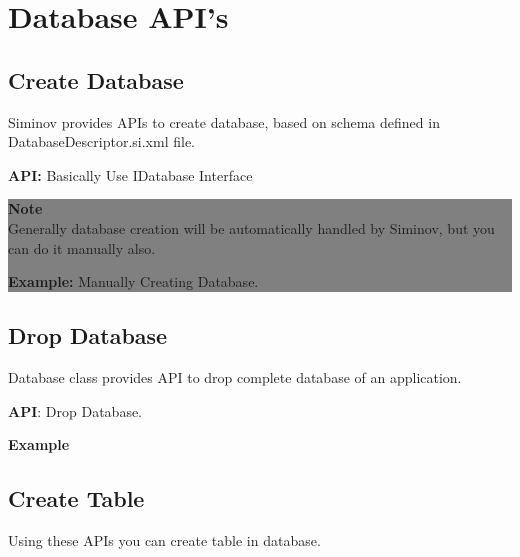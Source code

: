 \section{Database API's}
	
	\subsection{Create Database}Siminov provides APIs to create database, based on schema defined in DatabaseDescriptor.si.xml file.

			\textbf{API:} Basically Use IDatabase Interface
				
		
					\begin{center}
						\colorbox{grey}{
						\parbox[t]{.8\linewidth}{
							\fontsize{11pt}{11pt}\selectfont %
							\vspace*{0.1cm} %
		
							\hfill \textbf{Note} \\
							Generally database creation will be automatically handled by Siminov, but you can do it manually also.

							\textbf{Example:} Manually Creating Database.
								

							\vspace*{0.0cm} %
						}
					}

					\end{center}


	\subsection{Drop Database}Database class provides API to drop complete database of an application.

		\textbf{API}: Drop Database.
		
		

		\textbf{Example}
		



	\subsection{Create Table}Using these APIs you can create table in database.

